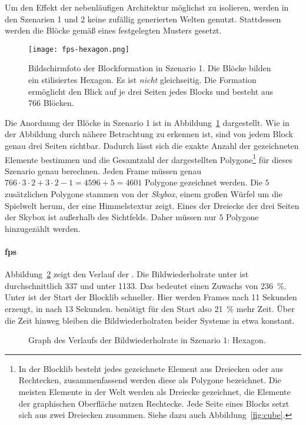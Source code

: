 
Um den Effekt der nebenläufigen Architektur möglichst zu isolieren, werden in den Szenarien 1 und 2 keine zufällig generierten Welten genutzt. Stattdessen werden die Blöcke gemäß eines festgelegten Musters gesetzt.

\begin{figure}
	\centering
	\texttt{[image: fps-hexagon.png]}
	\caption[Bildschirmfoto der Blockformation in Szenario 1 der Performanceanalyse.]{Bildschirmfoto der Blockformation in Szenario 1. Die Blöcke bilden ein stilisiertes Hexagon. Es ist \emph{nicht} gleichseitig. Die Formation ermöglicht den Blick auf je drei Seiten jedes Blocks und besteht aus 766 Blöcken.}\label{fig:hexagon}
\end{figure}
Die Anordnung der Blöcke in Szenario 1 ist in Abbildung~\ref{fig:hexagon} dargestellt. Wie in der Abbildung durch nähere Betrachtung zu erkennen ist, sind von jedem Block genau drei Seiten sichtbar. Dadurch lässt sich die exakte Anzahl der gezeichneten Elemente bestimmen und die Gesamtzahl der dargestellten Polygone\footnote{In der Blocklib besteht jedes gezeichnete Element aus Dreiecken oder aus Rechtecken, zusammenfassend werden diese als Polygone bezeichnet. Die meisten Elemente in der Welt werden als Dreiecke gezeichnet, die Elemente der graphischen Oberfläche nutzen Rechtecke. Jede Seite eines Blocks setzt sich aus zwei Dreiecken zusammen. Siehe dazu auch Abbildung~\ref{fig:cube}.} für dieses Szenario genau berechnen. Jeden Frame müssen genau $766\cdot3\cdot2 + 3\cdot2-1 = 4596 +5 = 4601$ Polygone gezeichnet werden. Die $5$ zusätzlichen Polygone stammen von der \emph{Skybox}, einem großen Würfel um die Spielwelt herum, der eine Himmelstextur zeigt. Eines der Dreiecke der drei Seiten der Skybox ist außerhalb des Sichtfelds. Daher müssen nur $5$ Polygone hinzugezählt werden.


\paragraph{\ac{fps}} Abbildung~\ref{fig:seed-0-hexagon-fps} zeigt den Verlauf der \si{\fps}. Die Bildwiederholrate unter \sysA{} ist durchschnittlich \SI{337}{\fps} und unter \sysB{} \SI{1133}{\fps}. Das bedeutet einen Zuwachs von \SI{236}{\percent}. Unter \sysA{} ist der Start der Blocklib schneller. Hier werden Frames nach 11 Sekunden erzeugt, in \sysB{} nach 13 Sekunden. \sysB{} benötigt für den Start also \SI{21}{\percent} mehr Zeit. Über die Zeit hinweg bleiben die Bildwiederholraten beider Systeme in etwa konstant.
\begin{figure}[!htbp]
	\settowidth{}
	\caption{Graph des Verlaufs der Bildwiederholrate in Szenario 1: Hexagon.}\label{fig:seed-0-hexagon-fps}
\end{figure}


